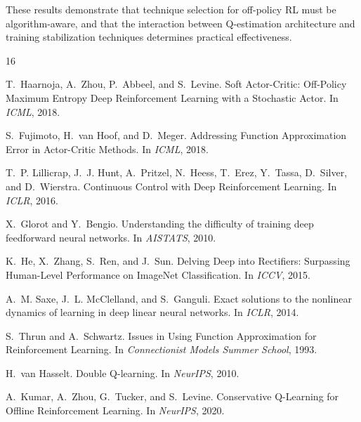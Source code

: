 \documentclass[11pt,a4paper]{article}
\begin{document}
These results demonstrate that technique selection for off-policy RL must be algorithm-aware, and that the interaction between Q-estimation architecture and training stabilization techniques determines practical effectiveness.



\begin{thebibliography}{16}

T.~Haarnoja, A.~Zhou, P.~Abbeel, and S.~Levine.
\newblock Soft Actor-Critic: Off-Policy Maximum Entropy Deep Reinforcement Learning with a Stochastic Actor.
\newblock In \emph{ICML}, 2018.

S.~Fujimoto, H.~van Hoof, and D.~Meger.
\newblock Addressing Function Approximation Error in Actor-Critic Methods.
\newblock In \emph{ICML}, 2018.

T.~P. Lillicrap, J.~J. Hunt, A.~Pritzel, N.~Heess, T.~Erez, Y.~Tassa, D.~Silver, and D.~Wierstra.
\newblock Continuous Control with Deep Reinforcement Learning.
\newblock In \emph{ICLR}, 2016.

X.~Glorot and Y.~Bengio.
\newblock Understanding the difficulty of training deep feedforward neural networks.
\newblock In \emph{AISTATS}, 2010.

K.~He, X.~Zhang, S.~Ren, and J.~Sun.
\newblock Delving Deep into Rectifiers: Surpassing Human-Level Performance on ImageNet Classification.
\newblock In \emph{ICCV}, 2015.

A.~M. Saxe, J.~L. McClelland, and S.~Ganguli.
\newblock Exact solutions to the nonlinear dynamics of learning in deep linear neural networks.
\newblock In \emph{ICLR}, 2014.

S.~Thrun and A.~Schwartz.
\newblock Issues in Using Function Approximation for Reinforcement Learning.
\newblock In \emph{Connectionist Models Summer School}, 1993.

H.~van Hasselt.
\newblock Double Q-learning.
\newblock In \emph{NeurIPS}, 2010.

A.~Kumar, A.~Zhou, G.~Tucker, and S.~Levine.
\newblock Conservative Q-Learning for Offline Reinforcement Learning.
\newblock In \emph{NeurIPS}, 2020.


\end{thebibliography}
\end{document}
